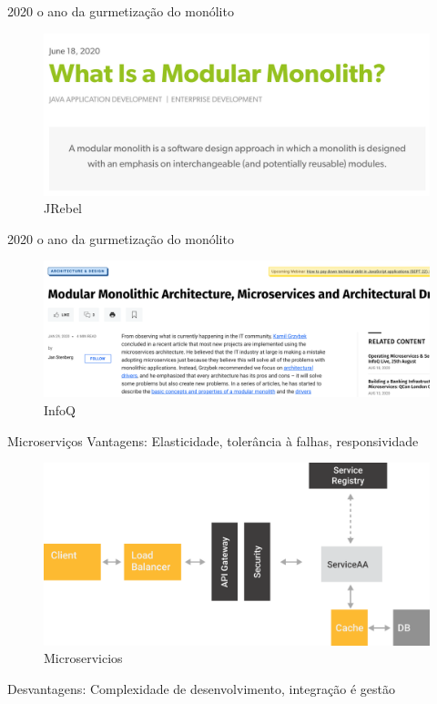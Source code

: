 \documentclass[aspectratio=169]{beamer}
\begin{document}
\begin{frame}{2020 o ano da gurmetização do monólito}
\begin{figure}
	\centering
	\includegraphics[width=0.8\linewidth]{Images/mmonolith1}
	\caption{JRebel}
\end{figure}
\end{frame}

\begin{frame}{2020 o ano da gurmetização do monólito}
\begin{figure}
	\centering
	\includegraphics[width=0.8\linewidth]{Images/mmonolith2}
	\caption{InfoQ}
\end{figure}
\end{frame}


\begin{frame}{Microserviços}
Vantagens: Elasticidade, tolerância à falhas, responsividade
\begin{figure}
\centering
\includegraphics[width=0.7\linewidth]{Images/microservicios}
\caption{Microservicios}
\end{figure}
Desvantagens: Complexidade de desenvolvimento, integração é gestão
\end{frame}
\end{document}
